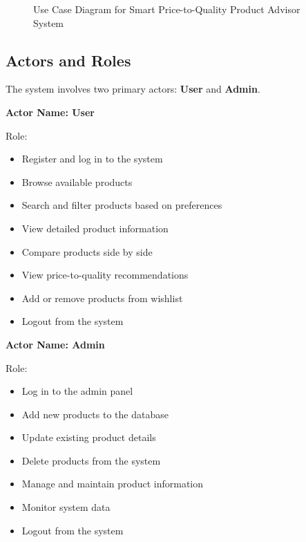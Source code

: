 \begin{figure}[H]
    \caption{Use Case Diagram for Smart Price-to-Quality Product Advisor System}
    \label{fig:use_case}
\end{figure}

\subsection{Actors and Roles}

The system involves two primary actors: \textbf{User} and \textbf{Admin}.

\textbf{Actor Name: User}

Role:
\begin{itemize}
\item Register and log in to the system
\item Browse available products
\item Search and filter products based on preferences
\item View detailed product information
\item Compare products side by side
\item View price-to-quality recommendations
\item Add or remove products from wishlist
\item Logout from the system
\end{itemize}

\textbf{Actor Name: Admin}

Role:
\begin{itemize}
\item Log in to the admin panel
\item Add new products to the database
\item Update existing product details
\item Delete products from the system
\item Manage and maintain product information
\item Monitor system data
\item Logout from the system
\end{itemize}

